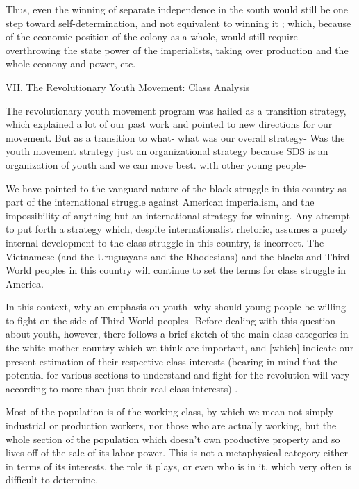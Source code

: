 \documentclass[12pt, titlepage]{article}
\begin{document}
{\begin{spacing}{1.10}
Thus, even the winning of separate independence in the south would still be one step toward self-determination, and not equivalent to winning it ; which, because of the economic position of the colony as a whole, would still require overthrowing the state power of the imperialists, taking over production and the whole econony and power, etc.

\begin{center}
VII. The Revolutionary Youth Movement: Class Analysis
\end{center}

The revolutionary youth movement program was hailed as a transition strategy, which explained a lot of our past work and pointed to new directions for our movement. But as a transition to what- what was our overall strategy- Was the youth movement strategy just an organizational strategy because SDS is an organization of youth and we can move best. with other young people-

We have pointed to the vanguard nature of the black struggle in this country as part of the international struggle against American imperialism, and the impossibility of anything but an international strategy for winning. Any attempt to put forth a strategy which, despite internationalist rhetoric, assumes a purely internal development to the class struggle in this country, is incorrect. The Vietnamese (and the Uruguayans and the Rhodesians) and the blacks and Third World peoples in this country will continue to set the terms for class struggle in America.

In this context, why an emphasis on youth- why should young people be willing to fight on the side of Third World peoples- Before dealing with this question about youth, however, there follows a brief sketch of the main class categories in the white mother country which we think are important, and [which] indicate our present estimation of their respective class interests (bearing in mind that the potential for various sections to understand and fight for the revolution will vary according to more than just their real class interests) .

Most of the population is of the working class, by which we mean not simply industrial or production workers, nor those who are actually working, but the whole section of the population which doesn't own productive property and so lives off of the sale of its labor power. This is not a metaphysical category either in terms of its interests, the role it plays, or even who is in it, which very often is difficult to determine.


\end{spacing}}
\end{document}
